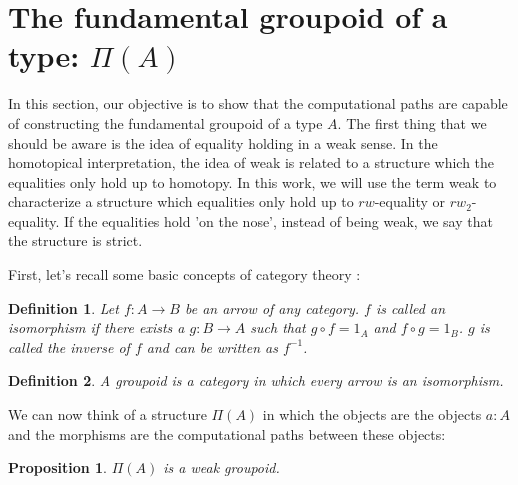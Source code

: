 \documentclass[12pt, a4paper,  oneside, headinclude,footinclude, BCOR5mm]{scrartcl}
\newtheorem{proposition}{Proposition}[section]
\newtheorem{definition}{Definition}[section]
\begin{document}
\section{The fundamental groupoid of a type: $\Pi(A)$}

In this section, our objective is to show that the computational paths are capable of constructing the fundamental groupoid of a type $A$. The first thing that we should be aware is the idea of equality holding in a weak sense. In the homotopical interpretation, the idea of weak is related to a structure which the equalities only hold up to homotopy. In this work, we will use the term weak to characterize a structure which equalities only hold up to $rw$-equality or $rw_{2}$-equality. If the equalities hold 'on the nose', instead of being weak, we say that the structure is strict.

First, let's recall some basic concepts of category theory \cite{Steve2}:

\begin{definition}

Let $f: A \rightarrow B$ be an arrow of any category. $f$ is called an isomorphism if there exists a $g: B \rightarrow A$ such that $g \circ f  = 1_{A}$ and $f \circ g = 1_{B}$. $g$ is called the inverse of $f$ and can be written as $f^{-1}$.

\end{definition}

\begin{definition}
A groupoid is a category in which every arrow is an isomorphism.
\end{definition}

We can now think of a structure $\Pi(A)$ in which the objects are the objects $a : A$ and the morphisms are the computational paths between these objects:

\begin{proposition}
$\Pi(A)$ is a weak groupoid.
\end{proposition}
\end{document}
